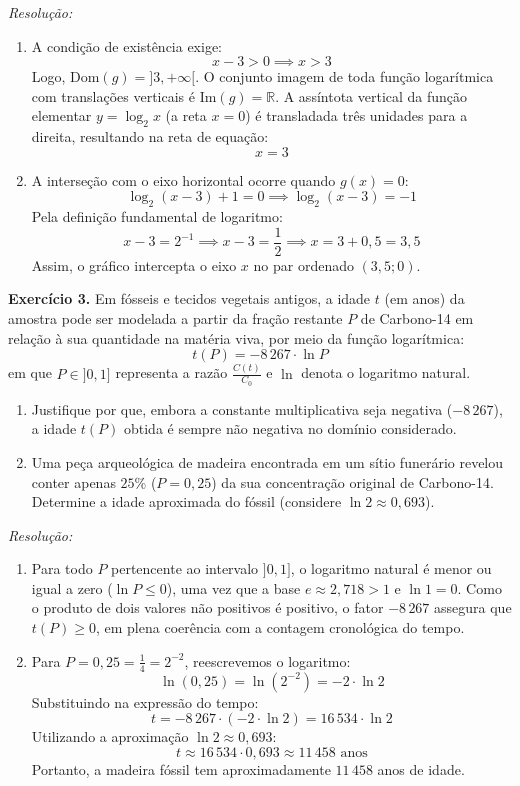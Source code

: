 \documentclass[12pt,a4paper]{report}
\begin{document}
	\textit{Resolução:}
	\begin{enumerate}[label=\textbf{\alph*)}]
		\item A condição de existência exige:
		$$x - 3 > 0 \implies x > 3$$
		Logo, $\text{Dom}(g) = {]3, +\infty[}$. O conjunto imagem de toda função logarítmica com translações verticais é $\text{Im}(g) = \mathbb{R}$.  
		A assíntota vertical da função elementar $y = \log_2 x$ (a reta $x = 0$) é transladada três unidades para a direita, resultando na reta de equação:
		$$x = 3$$
		
		\item A interseção com o eixo horizontal ocorre quando $g(x) = 0$:
		$$\log_2 (x - 3) + 1 = 0 \implies \log_2 (x - 3) = -1$$
		Pela definição fundamental de logaritmo:
		$$x - 3 = 2^{-1} \implies x - 3 = \frac{1}{2} \implies x = 3 + 0{,}5 = 3{,}5$$
		Assim, o gráfico intercepta o eixo $x$ no par ordenado $(3{,}5; 0)$.
	\end{enumerate}
	
	\vspace{0.3cm}
	
	\textbf{Exercício 3.}  
	Em fósseis e tecidos vegetais antigos, a idade $t$ (em anos) da amostra pode ser modelada a partir da fração restante $P$ de Carbono-14 em relação à sua quantidade na matéria viva, por meio da função logarítmica:
	$$t(P) = -8\,267 \cdot \ln P$$
	em que $P \in {]0, 1]}$ representa a razão $\frac{C(t)}{C_0}$ e $\ln$ denota o logaritmo natural.
	\begin{enumerate}[label=\textbf{\alph*)}]
		\item Justifique por que, embora a constante multiplicativa seja negativa ($-8\,267$), a idade $t(P)$ obtida é sempre não negativa no domínio considerado.
		\item Uma peça arqueológica de madeira encontrada em um sítio funerário revelou conter apenas $25\%$ ($P = 0{,}25$) da sua concentração original de Carbono-14. Determine a idade aproximada do fóssil (considere $\ln 2 \approx 0{,}693$).
	\end{enumerate}
	
	\textit{Resolução:}
	\begin{enumerate}[label=\textbf{\alph*)}]
		\item Para todo $P$ pertencente ao intervalo ${]0, 1]}$, o logaritmo natural é menor ou igual a zero ($\ln P \leqslant 0$), uma vez que a base $e \approx 2{,}718 > 1$ e $\ln 1 = 0$. Como o produto de dois valores não positivos é positivo, o fator $-8\,267$ assegura que $t(P) \geqslant 0$, em plena coerência com a contagem cronológica do tempo.
		
		\item Para $P = 0{,}25 = \frac{1}{4} = 2^{-2}$, reescrevemos o logaritmo:
		$$\ln(0{,}25) = \ln(2^{-2}) = -2 \cdot \ln 2$$
		Substituindo na expressão do tempo:
		$$t = -8\,267 \cdot (-2 \cdot \ln 2) = 16\,534 \cdot \ln 2$$
		Utilizando a aproximação $\ln 2 \approx 0{,}693$:
		$$t \approx 16\,534 \cdot 0{,}693 \approx 11\,458\text{ anos}$$
		Portanto, a madeira fóssil tem aproximadamente $11\,458$ anos de idade.
	\end{enumerate}
	
\end{document}
